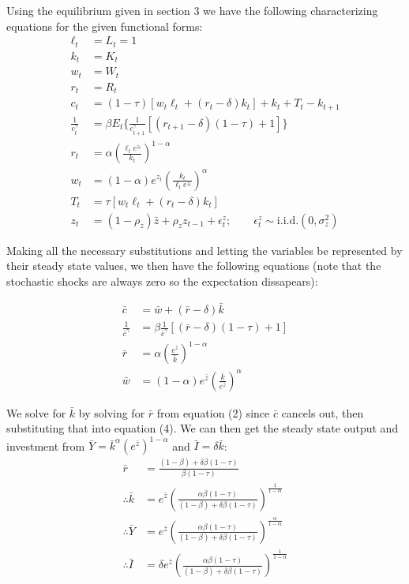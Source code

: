 \documentclass[letterpaper,11pt]{article}
\theoremstyle{definition}
\begin{document}
\begin{spacing}{1.5}
	Using the equilibrium given in section 3 we have the following characterizing equations for the given functional forms:
	\begin{align*}
		\ell_t &= L_t = 1 \\
		k_t &= K_t \\
		w_t &= W_t \\
		r_t &= R_t \\
		c_t &= (1-\tau)[w_t\ell_t+(r_t-\delta)k_t]+k_t+T_t-k_{t+1} \\
		\frac{1}{c_t^\gamma} &=  \beta E_t \{\frac{1}{c_{t+1}^\gamma}[(r_{t+1}-\delta)(1-\tau)+1]\} \\
		r_t&= \alpha (\frac{\ell_t e^{z_t}}{k_t})^{1-\alpha}\\
		w_t&= (1-\alpha)e^{z_t} (\frac{k_t}{\ell_t e^{z_t}})^{\alpha}\\
		T_t &= \tau[w_t\ell_t+(r_t-\delta)k_t] \\
		z_t &= (1-\rho_z)\bar{z}+\rho_zz_{t-1}+\epsilon_t^z; \qquad \epsilon_t^z \sim \text{i.i.d.}(0,\sigma_z^2)
	\end{align*}

	Making all the necessary substitutions and letting the variables be represented by their steady state values, we then have the following equations (note that the stochastic shocks are always zero so the expectation dissapears):

	\begin{align}
		\bar{c} &= \bar{w}+(\bar{r}-\delta)\bar{k} \\
		\frac{1}{\bar{c}^\gamma} &=  \beta \frac{1}{\bar{c}^\gamma}[(\bar{r}-\delta)(1-\tau)+1]\\
		\bar{r}&= \alpha (\frac{ e^{\bar{z}}}{\bar{k}})^{1-\alpha}\\
		\bar{w}&= (1-\alpha)e^{\bar{z}} (\frac{\bar{k}}{ e^{\bar{z}}})^{\alpha}
	\end{align}

	We solve for $\bar{k}$ by solving for $\bar{r}$ from equation (2) since $\bar{c}$ cancels out, then substituting that into equation (4). We can then get the steady state output and investment from $\bar{Y} = \bar{k}^\alpha (e^{\bar{z}})^{1-\alpha}$ and $\bar{I}=\delta\bar{k}$:
	\begin{align*}
		\bar{r} &= \frac{(1-\beta)+\delta\beta(1-\tau)}{\beta(1-\tau)} \\
		\therefore \bar{k} &= e^{\bar{z}}(\frac{\alpha\beta(1-\tau)}{(1-\beta)+\delta\beta(1-\tau)})^{\frac{1}{1-\alpha}} \\
		\therefore \bar{Y} &=e^{\bar{z}}(\frac{\alpha\beta(1-\tau)}{(1-\beta)+\delta\beta(1-\tau)})^{\frac{\alpha}{1-\alpha}} \\
		\therefore \bar{I} &= \delta e^{\bar{z}}(\frac{\alpha\beta(1-\tau)}{(1-\beta)+\delta\beta(1-\tau)})^{\frac{1}{1-\alpha}}
	\end{align*}


\end{spacing}
\end{document}
